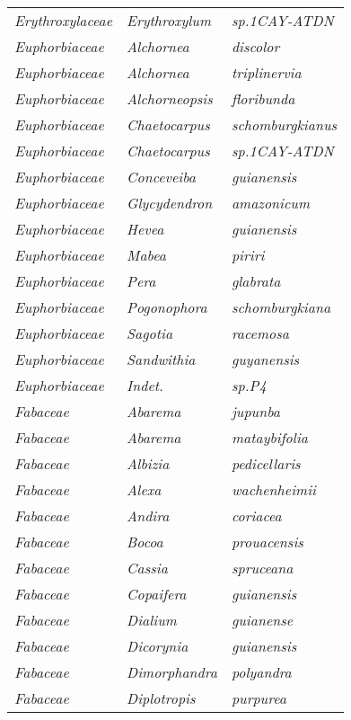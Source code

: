 \documentclass[fleqn,10pt]{ArtEcoFoG} %
\renewenvironment{table}{\begin{table*}}{\end{table*}\ignorespacesafterend}
\begin{document}
\begin{table}
\begin{tabular}[t]{lll}
\em{Erythroxylaceae} & \em{Erythroxylum} & \em{sp.1CAY-ATDN}\\
\addlinespace
\em{Euphorbiaceae} & \em{Alchornea} & \em{discolor}\\
\em{Euphorbiaceae} & \em{Alchornea} & \em{triplinervia}\\
\em{Euphorbiaceae} & \em{Alchorneopsis} & \em{floribunda}\\
\em{Euphorbiaceae} & \em{Chaetocarpus} & \em{schomburgkianus}\\
\em{Euphorbiaceae} & \em{Chaetocarpus} & \em{sp.1CAY-ATDN}\\
\addlinespace
\em{Euphorbiaceae} & \em{Conceveiba} & \em{guianensis}\\
\em{Euphorbiaceae} & \em{Glycydendron} & \em{amazonicum}\\
\em{Euphorbiaceae} & \em{Hevea} & \em{guianensis}\\
\em{Euphorbiaceae} & \em{Mabea} & \em{piriri}\\
\em{Euphorbiaceae} & \em{Pera} & \em{glabrata}\\
\addlinespace
\em{Euphorbiaceae} & \em{Pogonophora} & \em{schomburgkiana}\\
\em{Euphorbiaceae} & \em{Sagotia} & \em{racemosa}\\
\em{Euphorbiaceae} & \em{Sandwithia} & \em{guyanensis}\\
\em{Euphorbiaceae} & \em{Indet.} & \em{sp.P4}\\
\em{Fabaceae} & \em{Abarema} & \em{jupunba}\\
\addlinespace
\em{Fabaceae} & \em{Abarema} & \em{mataybifolia}\\
\em{Fabaceae} & \em{Albizia} & \em{pedicellaris}\\
\em{Fabaceae} & \em{Alexa} & \em{wachenheimii}\\
\em{Fabaceae} & \em{Andira} & \em{coriacea}\\
\em{Fabaceae} & \em{Bocoa} & \em{prouacensis}\\
\addlinespace
\em{Fabaceae} & \em{Cassia} & \em{spruceana}\\
\em{Fabaceae} & \em{Copaifera} & \em{guianensis}\\
\em{Fabaceae} & \em{Dialium} & \em{guianense}\\
\em{Fabaceae} & \em{Dicorynia} & \em{guianensis}\\
\em{Fabaceae} & \em{Dimorphandra} & \em{polyandra}\\
\addlinespace
\em{Fabaceae} & \em{Diplotropis} & \em{purpurea}\\

\end{tabular}
\end{table}
\end{document}
